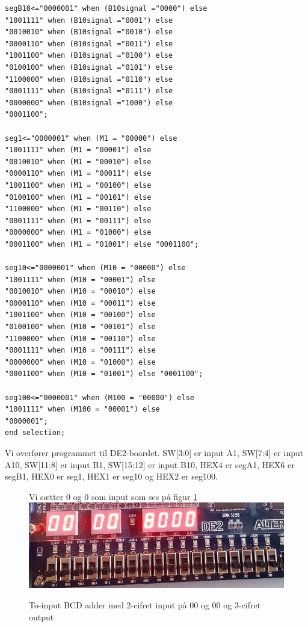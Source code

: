 \begin{enumerate}
\begin{lstlisting}[caption={To-input BCD adder med 3-cifret output},label={lst:TwoInputBCDAdder3Output}]
segB10<="0000001" when (B10signal ="0000") else
"1001111" when (B10signal ="0001") else
"0010010" when (B10signal ="0010") else
"0000110" when (B10signal ="0011") else
"1001100" when (B10signal ="0100") else
"0100100" when (B10signal ="0101") else
"1100000" when (B10signal ="0110") else
"0001111" when (B10signal ="0111") else
"0000000" when (B10signal ="1000") else
"0001100";

seg1<="0000001" when (M1 = "00000") else
"1001111" when (M1 = "00001") else
"0010010" when (M1 = "00010") else
"0000110" when (M1 = "00011") else
"1001100" when (M1 = "00100") else
"0100100" when (M1 = "00101") else
"1100000" when (M1 = "00110") else
"0001111" when (M1 = "00111") else
"0000000" when (M1 = "01000") else
"0001100" when (M1 = "01001") else "0001100";

seg10<="0000001" when (M10 = "00000") else
"1001111" when (M10 = "00001") else
"0010010" when (M10 = "00010") else
"0000110" when (M10 = "00011") else
"1001100" when (M10 = "00100") else
"0100100" when (M10 = "00101") else
"1100000" when (M10 = "00110") else
"0001111" when (M10 = "00111") else
"0000000" when (M10 = "01000") else
"0001100" when (M10 = "01001") else "0001100";

seg100<="0000001" when (M100 = "00000") else
"1001111" when (M100 = "00001") else
"0000001";
end selection;
		\end{lstlisting}

Vi overfører programmet til DE2-boardet. SW[3:0] er input A1, SW[7:4] er input A10, SW[11:8] er input B1, SW[15:12] er input B10, HEX4 er segA1, HEX6 er segB1, HEX0 er seg1, HEX1 er seg10 og HEX2 er seg100. 
\begin{figure}[h]
	Vi sætter 0 og 0 som input som ses på figur \ref{fig:BCD_2seg_adder_0}
	\centering
	\includegraphics[scale=0.6]{pictures/Oevelse4/BCD_adder/BCD_2seg_adder_0.jpg}
	\caption{To-input BCD adder med 2-cifret input på 00 og 00 og 3-cifret output}
	\label{fig:BCD_2seg_adder_0}
\end{figure}


\end{enumerate}
